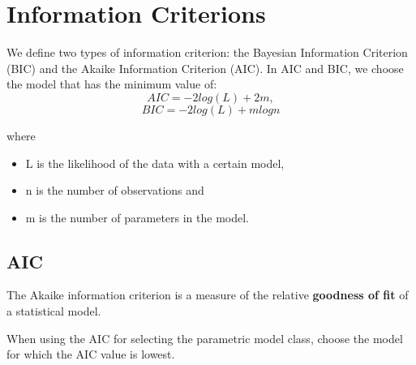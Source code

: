 


\section{Information Criterions}


We define two types of information criterion: the Bayesian Information
Criterion (BIC) and the Akaike Information Criterion (AIC). In AIC and BIC, we choose the model that
has the minimum value of:
\[AIC = −2log(L)+2m,\]
\[BIC = −2log(L)+mlogn\]

where
\begin{itemize}
\item L is the likelihood of the data with a certain model,
\item n is the number of observations and
\item m is the number of parameters in the model.
\end{itemize}
\subsection{AIC}
The Akaike information criterion is a measure of the relative \textbf{goodness of fit} of a statistical model.

When using the AIC for selecting the parametric model class, choose
the model for which the AIC value is lowest.

